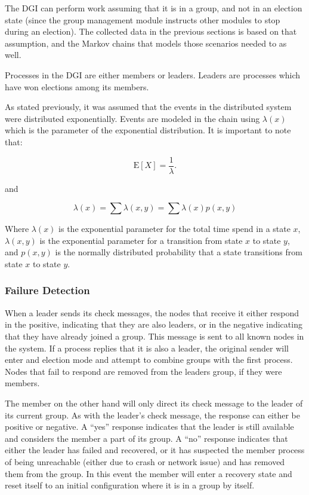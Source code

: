 The DGI can perform work assuming that it is in a group, and not in an election state (since the group management module instructs other modules to stop during an election). The collected data in the previous sections is based on that assumption, and the Markov chains that models those scenarios needed to as well.

Processes in the DGI are either members or leaders. Leaders are processes which have won elections among its members.

As stated previously, it was assumed that the events in the distributed system were distributed exponentially. Events are modeled in the chain using $\lambda(x)$ which is the parameter of the exponential distribution. It is important to note that:

\begin{equation}
\mathrm{E}[X] = \frac{1}{\lambda}. \!
\end{equation}

and

\begin{equation}
\lambda(x) = \sum \lambda(x,y) = \sum \lambda(x) p(x,y)
\end{equation}

Where $\lambda(x)$ is the exponential parameter for the total time spend in a state $x$, $\lambda(x,y)$ is the exponential parameter for a transition from state $x$ to state $y$, and $p(x,y)$ is the normally distributed probability that a state transitions from state $x$ to state $y$.

\subsubsection{Failure Detection}
When a leader sends its check messages, the nodes that receive it either respond in the positive, indicating that they are also leaders, or in the negative indicating that they have already joined a group. This message is sent to all known nodes in the system. If a process replies that it is also a leader, the original sender will enter and election mode and attempt to combine groups with the first process. Nodes that fail to respond are removed from the leaders group, if they were members.

The member on the other hand will only direct its check message to the leader of its current group. As with the leader's check message, the response can either be positive or negative. A ``yes'' response indicates that the leader is still available and considers the member a part of its group. A ``no'' response indicates that either the leader has failed and recovered, or it has suspected the member process of being unreachable (either due to crash or network issue) and has removed them from the group. In this event the member will enter a recovery state and reset itself to an initial configuration where it is in a group by itself.

